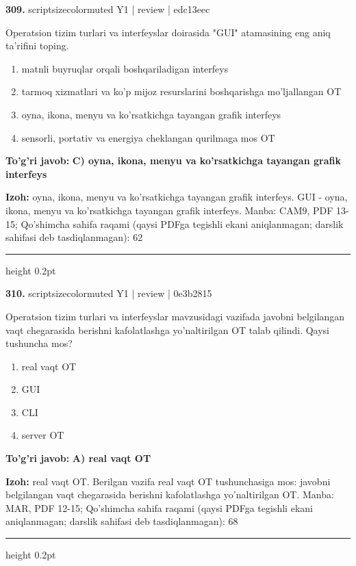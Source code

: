 \documentclass[10pt,a4paper]{article}
\begin{document}
{\bfseries\sffamily\color{ink} 309.} {scriptsizecolor{muted} Y1 | review | edc13eec}
\par
Operatsion tizim turlari va interfeyslar doirasida "GUI" atamasining eng aniq ta'rifini toping.
\begin{enumerate}[label=\Alph*),leftmargin=9mm]
\item matnli buyruqlar orqali boshqariladigan interfeys
\item tarmoq xizmatlari va ko'p mijoz resurslarini boshqarishga mo'ljallangan OT
\item oyna, ikona, menyu va ko'rsatkichga tayangan grafik interfeys
\item sensorli, portativ va energiya cheklangan qurilmaga mos OT
\end{enumerate}
\begin{tcolorbox}[enhanced,breakable,colback=teal!4,colframe=teal!60!black,boxrule=0.45pt,arc=1.2mm,left=2.7mm,right=2.7mm,top=1.8mm,bottom=1.8mm,before skip=2mm,after skip=2mm]
{\bfseries\sffamily\color{teal}To'g'ri javob:} \textbf{C) oyna, ikona, menyu va ko'rsatkichga tayangan grafik interfeys}
\par\smallskip
{\bfseries Izoh:} oyna, ikona, menyu va ko'rsatkichga tayangan grafik interfeys. GUI - oyna, ikona, menyu va ko'rsatkichga tayangan grafik interfeys. Manba: CAM9, PDF 13-15; Qo'shimcha sahifa raqami (qaysi PDFga tegishli ekani aniqlanmagan; darslik sahifasi deb tasdiqlanmagan): 62
\end{tcolorbox}
\vspace{2mm}\hrule height 0.2pt\vspace{3mm}

{\bfseries\sffamily\color{ink} 310.} {scriptsizecolor{muted} Y1 | review | 0e3b2815}
\par
Operatsion tizim turlari va interfeyslar mavzusidagi vazifada javobni belgilangan vaqt chegarasida berishni kafolatlashga yo'naltirilgan OT talab qilindi. Qaysi tushuncha mos?
\begin{enumerate}[label=\Alph*),leftmargin=9mm]
\item real vaqt OT
\item GUI
\item CLI
\item server OT
\end{enumerate}
\begin{tcolorbox}[enhanced,breakable,colback=teal!4,colframe=teal!60!black,boxrule=0.45pt,arc=1.2mm,left=2.7mm,right=2.7mm,top=1.8mm,bottom=1.8mm,before skip=2mm,after skip=2mm]
{\bfseries\sffamily\color{teal}To'g'ri javob:} \textbf{A) real vaqt OT}
\par\smallskip
{\bfseries Izoh:} real vaqt OT. Berilgan vazifa real vaqt OT tushunchasiga mos: javobni belgilangan vaqt chegarasida berishni kafolatlashga yo'naltirilgan OT. Manba: MAR, PDF 12-15; Qo'shimcha sahifa raqami (qaysi PDFga tegishli ekani aniqlanmagan; darslik sahifasi deb tasdiqlanmagan): 68
\end{tcolorbox}
\vspace{2mm}\hrule height 0.2pt\vspace{3mm}
\end{document}
